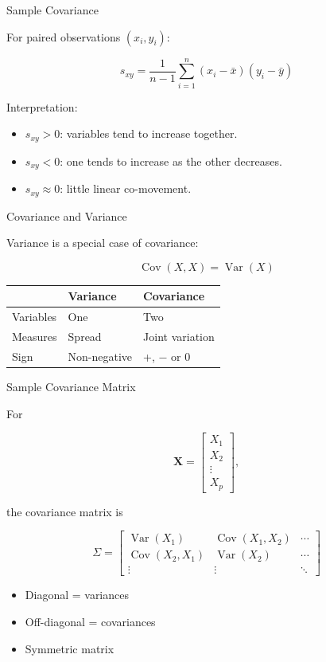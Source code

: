 \documentclass[aspectratio=169,11pt]{beamer}
\newcommand{\Var}{\operatorname{Var}}
\newcommand{\Cov}{\operatorname{Cov}}
\begin{document}
\begin{frame}{Sample Covariance}

For paired observations $(x_i,y_i)$:

\[
\boxed{
s_{xy}
=
\frac{1}{n-1}
\sum_{i=1}^{n}
(x_i-\bar{x})(y_i-\bar{y})
}
\]

Interpretation:

\begin{itemize}
    \item $s_{xy}>0$: variables tend to increase together.
    \item $s_{xy}<0$: one tends to increase as the other decreases.
    \item $s_{xy}\approx0$: little linear co-movement.
\end{itemize}

\end{frame}

\begin{frame}{Covariance and Variance}

Variance is a special case of covariance:

\[
\boxed{
\Cov(X,X)=\Var(X)
}
\]

\begin{center}
\begin{tabular}{lll}
\toprule
 & Variance & Covariance\\
\midrule
Variables & One & Two\\
Measures & Spread & Joint variation\\
Sign & Non-negative & +, $-$ or 0\\
\bottomrule
\end{tabular}
\end{center}

\end{frame}

\begin{frame}{Sample Covariance Matrix}

For

\[
\mathbf{X}
=
\begin{bmatrix}
X_1\\X_2\\\vdots\\X_p
\end{bmatrix},
\]

the covariance matrix is

\[
\boxed{
\Sigma=
\begin{bmatrix}
\Var(X_1)&\Cov(X_1,X_2)&\cdots\\
\Cov(X_2,X_1)&\Var(X_2)&\cdots\\
\vdots&\vdots&\ddots
\end{bmatrix}
}
\]

\begin{itemize}
    \item Diagonal = variances
    \item Off-diagonal = covariances
    \item Symmetric matrix
\end{itemize}

\end{frame}
\end{document}
